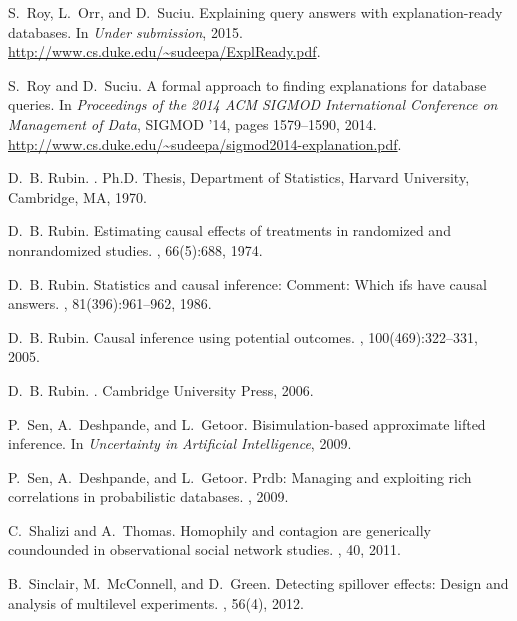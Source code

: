 \begin{thebibliography}{10}
S.~Roy, L.~Orr, and D.~Suciu.
\newblock Explaining query answers with explanation-ready databases.
\newblock In {\em {Under submission}}, 2015.
\newblock \mbox{\url{http://www.cs.duke.edu/~sudeepa/ExplReady.pdf}}.

S.~Roy and D.~Suciu.
\newblock A formal approach to finding explanations for database queries.
\newblock In {\em Proceedings of the 2014 ACM SIGMOD International Conference
  on Management of Data}, SIGMOD '14, pages 1579--1590, 2014.
\newblock
  \mbox{\url{http://www.cs.duke.edu/~sudeepa/sigmod2014-explanation.pdf}}.

D.~B. Rubin.
.
\newblock Ph.D. Thesis, Department of Statistics, Harvard University,
  Cambridge, MA, 1970.

D.~B. Rubin.
\newblock Estimating causal effects of treatments in randomized and
  nonrandomized studies.
, 66(5):688, 1974.

D.~B. Rubin.
\newblock Statistics and causal inference: Comment: Which ifs have causal
  answers.
,
  81(396):961--962, 1986.

D.~B. Rubin.
\newblock Causal inference using potential outcomes.
,
  100(469):322--331, 2005.

D.~B. Rubin.
.
\newblock Cambridge University Press, 2006.

P.~Sen, A.~Deshpande, and L.~Getoor.
\newblock Bisimulation-based approximate lifted inference.
\newblock In {\em Uncertainty in Artificial Intelligence}, 2009.

P.~Sen, A.~Deshpande, and L.~Getoor.
\newblock Prdb: Managing and exploiting rich correlations in probabilistic
  databases.
, 2009.

C.~Shalizi and A.~Thomas.
\newblock Homophily and contagion are generically coundounded in observational
  social network studies.
, 40, 2011.

B.~Sinclair, M.~Mc{C}onnell, and D.~Green.
\newblock Detecting spillover effects: Design and analysis of multilevel
  experiments.
, 56(4), 2012.


\end{thebibliography}

